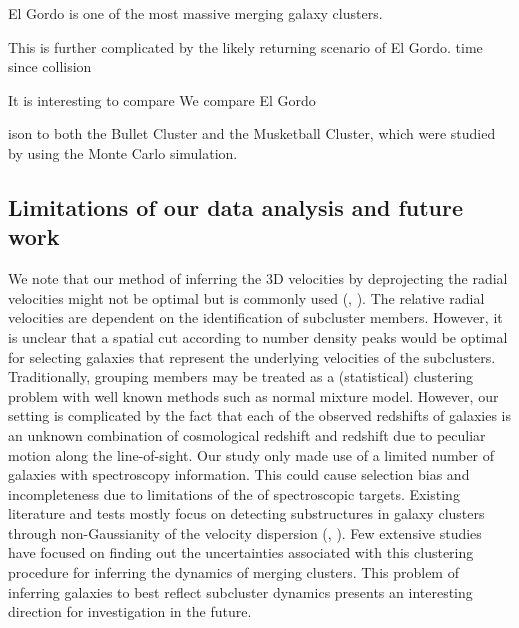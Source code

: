 El Gordo is one of the most massive merging galaxy clusters. 

This is further complicated by the likely returning scenario of El Gordo.
time since collision 




It is interesting to compare 
We compare El Gordo 



ison to both the Bullet Cluster and the Musketball
Cluster, which were studied by  using the Monte Carlo simulation.

%
\subsection{Limitations of our data analysis and future work} 
We note that our method of inferring the 3D velocities by deprojecting the
radial velocities might not be optimal but is commonly used (,
\citealt{Dawson12}). The relative
radial velocities are dependent on the identification of subcluster members.
However, it is unclear that a spatial
cut according to number density peaks would be optimal for selecting
galaxies that represent the underlying velocities of the subclusters. Traditionally, grouping members
may be treated as a (statistical) clustering problem with well known
methods such as normal mixture model. However, our setting is complicated
by the fact that each of the observed redshifts of galaxies is an unknown
combination of cosmological redshift and redshift due to peculiar motion
along the line-of-sight. Our study only made use of a limited number of
galaxies with spectroscopy information. This could cause selection bias and
incompleteness due to limitations of the of spectroscopic targets. Existing
literature and tests mostly focus on detecting substructures in galaxy
clusters through non-Gaussianity of the velocity dispersion
(\citealt{Dressler88}, \citealt{Einasto12}). Few extensive studies have focused on finding out the uncertainties
associated with this clustering procedure for inferring the dynamics of
merging clusters. This problem of inferring galaxies to best reflect
subcluster dynamics presents an interesting direction for investigation in the future.   
 
